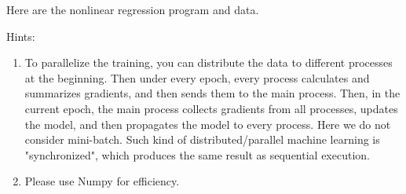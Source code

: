 \documentclass[12pt,letterpaper, onecolumn]{exam}
\begin{document}
\begin{questions}
    Here are the nonlinear regression program and data.

    Hints:

    \begin{enumerate}[label=(\theenumi)]
        \item To parallelize the training, you can distribute the data to different processes at the beginning. 
        Then under every epoch, every process calculates and summarizes gradients, and then sends them to the main process. 
        Then, in the current epoch, the main process collects gradients from all processes, updates the model, and then propagates
         the model to every process. Here we do not consider mini-batch. Such kind of distributed/parallel machine learning is 
         "synchronized", which produces the same result as sequential execution.
        \item Please use Numpy for efficiency.
    \end{enumerate}


\end{questions}
\end{document}
